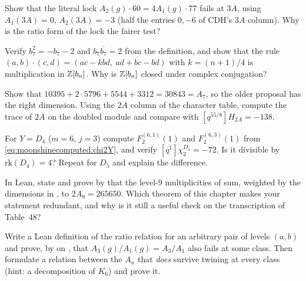 \begin{exercise}[$\star$]\label{exo:moonshinecomputed:lock}
Show that the literal lock $A_2(g)\cdot60=4A_1(g)\cdot77$ fails at $3A$, using
$A_1(3A)=0$, $A_2(3A)=-3$ (half the entries $0,-6$ of CDH's $3A$ column). Why is the ratio
form of the lock the fairer test?
\end{exercise}

\begin{exercise}[$\star\star$]\label{exo:moonshinecomputed:b7}
Verify $b_7^2=-b_7-2$ and $b_7\overline{b_7}=2$ from the definition, and show that the
rule $(a,b)\cdot(c,d)=(ac-kbd,\ ad+bc-bd)$ with $k=(n+1)/4$ is multiplication in
$\mathbb{Z}[b_n]$. Why is $\mathbb{Z}[b_n]$ closed under complex conjugation?
\end{exercise}

\begin{exercise}[$\star\star$]\label{exo:moonshinecomputed:A7}
Show that $10395+2\cdot5796+5544+3312=30843=A_7$, so the older proposal has the right
dimension. Using the $2A$ column of the character table, compute the trace of $2A$ on the
doubled module and compare with $[q^{55/8}]H_{2A}=-138$.
\end{exercise}

\begin{exercise}[$\star\star$]\label{exo:moonshinecomputed:D4}
For $Y=D_4$ ($m=6$, $j=3$) compute $F_2^{(6,1)}(1)$ and $F_2^{(6,3)}(1)$ from
\eqref{eq:moonshinecomputed:chi2Y}, and verify $[q^1]\chi_2^{D_4}=-72$. Is it divisible by
$\mathrm{rk}(D_4)=4$? Repeat for $D_5$ and explain the difference.
\end{exercise}

\begin{exercise}[$\star\star$]\label{exo:moonshinecomputed:lean1}
In Lean, state and prove by  that the level-$9$ multiplicities of
 sum, weighted by the dimensions in , to $2A_9=265650$. Which
theorem of this chapter makes your statement redundant, and why is it still a useful
check on the transcription of Table~48?
\end{exercise}

\begin{exercise}[$\star\star\star$]\label{exo:moonshinecomputed:lean2}
Write a Lean definition of the ratio relation for an arbitrary pair of levels $(a,b)$ and
prove, by  on , that $A_3(g)/A_1(g)=A_3/A_1$ also fails at
some class. Then formulate a relation between the $A_n$ that \emph{does} survive twining at
every class (hint: a decomposition of $K_6$) and prove it.
\end{exercise}

